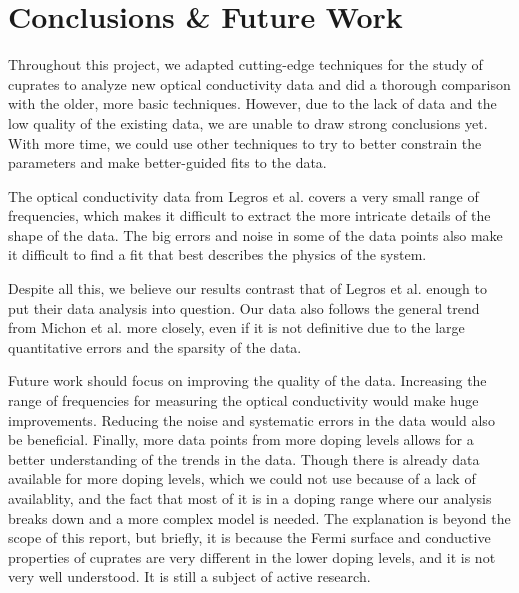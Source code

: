 \newpage
\section{Conclusions \& Future Work}
Throughout this project, we adapted cutting-edge techniques for the study of cuprates to analyze
new optical conductivity data and did a thorough comparison with the older, more basic techniques.
However, due to the lack of data and the low quality of the existing data, we are unable to draw
strong conclusions yet. With more time, we could use other techniques to try to better constrain
the parameters and make better-guided fits to the data.

The optical conductivity data from Legros et al. covers a very small range of frequencies, which
makes it difficult to extract the more intricate details of the shape of the data. The big errors
and noise in some of the data points also make it difficult to find a fit that best describes the
physics of the system.

Despite all this, we believe our results contrast that of Legros et al. enough to put their data
analysis into question. Our data also follows the general trend from Michon et al. more closely,
even if it is not definitive due to the large quantitative errors and the sparsity of the data.

Future work should focus on improving the quality of the data. Increasing the range of frequencies
for measuring the optical conductivity would make huge improvements. Reducing the noise and
systematic errors in the data would also be beneficial. Finally, more data points from more
doping levels allows for a better understanding of the trends in the data. Though there is already
data available for more doping levels, which we could not use because of a lack of availablity, and
the fact that most of it is in a doping range where our analysis breaks down and a more complex
model is needed. The explanation is beyond the scope of this report, but briefly, it is because the
Fermi surface and conductive properties of cuprates are very different in the lower doping levels,
and it is not very well understood. It is still a subject of active research.
\newpage